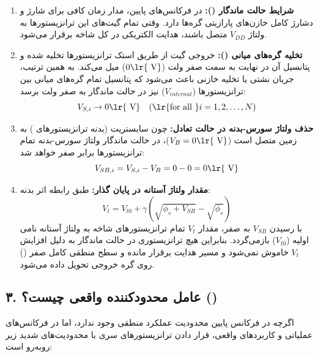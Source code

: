 \begin{enumerate}
\item \textbf{شرایط حالت ماندگار ():}
در فرکانس‌های پایین، مدار زمان کافی برای شارژ و دشارژ کامل خازن‌های پارازیتی گره‌ها دارد. وقتی تمام گیت‌های این ترانزیستورها به ولتاژ \(V_{DD}\) متصل باشند، هدایت الکتریکی در کل شاخه برقرار می‌شود.

\item \textbf{تخلیه گره‌های میانی ():}
خروجی گیت از طریق استک ترانزیستورها تخلیه شده و پتانسیل آن در نهایت به سمت صفر ولت (\(0\text{\lr{ V}}\)) میل می‌کند. به همین ترتیب، جریان نشتی یا تخلیه خازنی باعث می‌شود که پتانسیل تمام گره‌های میانی بین ترانزیستورها (\(V_{internal}\)) نیز در حالت ماندگار به صفر ولت برسد:
\[V_{S,i} \to 0\text{\lr{ V}} \quad (\text{\lr{for all }} i = 1, 2, \dots, N)\]

\item \textbf{حذف ولتاژ سورس-بدنه در حالت تعادل:}
چون سابستریت (بدنه ترانزیستورهای ) به زمین متصل است (\(V_B = 0\text{\lr{ V}}\))، در حالت ماندگار ولتاژ سورس-بدنه تمام ترانزیستورها برابر صفر خواهد شد:
\[V_{SB,i} = V_{S,i} - V_B = 0 - 0 = 0\text{\lr{ V}}\]

\item \textbf{مقدار ولتاژ آستانه در پایان گذار:}
طبق رابطه اثر بدنه:
\[V_t = V_{t0} + \gamma \left( \sqrt{\phi_s + V_{SB}} - \sqrt{\phi_s} \right)\]
با رسیدن \(V_{SB}\) به صفر، مقدار \(V_t\) تمام ترانزیستورهای شاخه به ولتاژ آستانه نامی اولیه (\(V_{t0}\)) بازمی‌گردد. بنابراین هیچ ترانزیستوری در حالت ماندگار به دلیل افزایش \(V_t\) خاموش نمی‌شود و مسیر هدایت  برقرار مانده و سطح منطقی کامل صفر () روی گره خروجی تحویل داده می‌شود.

\end{enumerate}

\subsection*{۳. عامل محدودکننده واقعی چیست؟ ()}

اگرچه در فرکانس پایین محدودیت عملکرد منطقی وجود ندارد، اما در فرکانس‌های عملیاتی و کاربردهای واقعی، قرار دادن ترانزیستورهای سری با محدودیت‌های شدید زیر روبه‌رو است:

